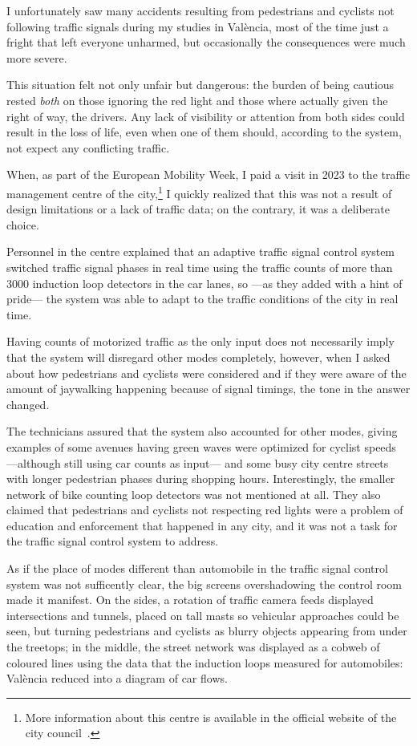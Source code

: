 I unfortunately saw many accidents resulting from pedestrians and cyclists not
 following traffic signals during my studies in València, most of the time just
 a fright that left everyone unharmed, but occasionally the consequences were much more severe.
 
This situation felt not only unfair but dangerous: the burden of being cautious rested \textit{both} on those ignoring the red light and those where actually given the right of way, the drivers. Any lack of visibility or attention from both sides could result in the loss of life, even when one of them should, according to the system, not expect any conflicting traffic.

\medskip
\noindent When, as part of the European Mobility Week, I paid a visit in 2023 to the traffic management centre of the city,\footnote{More information about this centre is available in the official website of the city council~\cite{aytoval}.} I quickly realized that this was not a result of design limitations or a lack of traffic data; on the contrary, it was a deliberate choice. 

Personnel in the centre explained  that an adaptive traffic signal control system switched traffic signal phases in real time using the traffic counts of more than 3000 induction loop detectors in the car lanes, so —as they added with a hint of pride— the system was able to adapt to the traffic conditions of the city in real time.

Having counts of motorized traffic as the only input does not necessarily imply that the system will disregard other modes completely, however, when I asked about how pedestrians and cyclists were considered and if they were aware of the amount of jaywalking happening because of signal timings, the tone in the answer changed.

The technicians assured that the system also accounted for other modes, giving examples of some avenues having green waves were optimized for cyclist speeds —although still using car counts as input— and some busy city centre streets with longer pedestrian phases during shopping hours. Interestingly, the smaller network of bike counting loop detectors was not mentioned at all. They also claimed that pedestrians and cyclists not respecting red lights were a problem of education and enforcement that happened in any city, and it was not a task for the traffic signal control system to address.

As if the place of modes different than automobile in the traffic signal control system was not sufficently clear, the big screens overshadowing the control room made it manifest. On the sides, a rotation of traffic camera feeds displayed intersections and tunnels, placed on tall masts so vehicular approaches could be seen, but turning pedestrians and cyclists as blurry objects appearing from under the treetops; in the middle, the street network was displayed as a cobweb of coloured lines using the data that the induction loops measured for automobiles: València reduced into a diagram of car flows.


